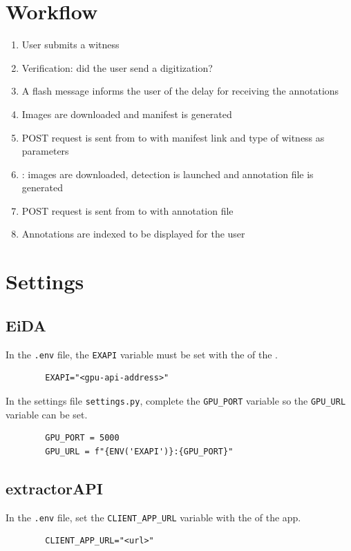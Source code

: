 \section{Workflow}
	\begin{enumerate}
	\item User submits a witness
	\item Verification: did the user send a digitization?
	\item A flash message informs the user of the delay for receiving the annotations
	\item Images are downloaded and \iiif manifest is generated
	\item POST request is sent from \eida to \exapi with manifest link and type of witness as parameters
	\item \api: images are downloaded, detection is launched and annotation file is generated
	\item POST request is sent from \exapi to \eida with annotation file
	\item Annotations are indexed to be displayed for the user
	\end{enumerate}

\section{Settings}
	\subsection{EiDA}
	In the \texttt{.env} file, the \texttt{EXAPI} variable must be set with the \URL of the \api.
	\begin{lstlisting}
		EXAPI="<gpu-api-address>"\end{lstlisting}
	
	In the settings file \texttt{settings.py}, complete the \texttt{GPU\_PORT} variable so the \texttt{GPU\_URL} variable can be set.
	\begin{lstlisting}
		GPU_PORT = 5000
		GPU_URL = f"{ENV('EXAPI')}:{GPU_PORT}"\end{lstlisting}

	\subsection{extractorAPI}
	In the \texttt{.env} file, set the \texttt{CLIENT\_APP\_URL} variable with the \URL of the app.
	\begin{lstlisting}
		CLIENT_APP_URL="<url>"\end{lstlisting}

